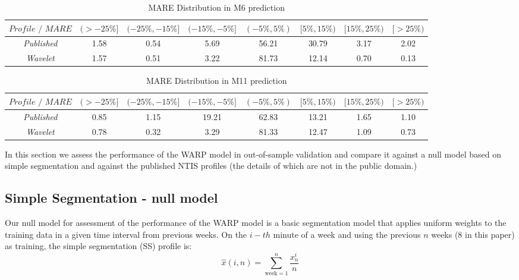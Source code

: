 \documentclass[a4paper, 10pt, conference]{ieeeconf}      %
\begin{document}
\begin{table}[bp]
	\caption{MARE Distribution in M6 prediction}
	\centering
	\begin{center}
	\begin{tabular}{SSSSSSSS} \toprule
    {$\textit{Profile / MARE}$} & {$(>-25\%]$} & {$(-25\%,-15\%] $} & {$(-15\%,-5\%]$} & {$(-5\%,5\%)$} & {$[5\%,15\%)$} & {$[15\%,25\%)$} & {$[>25\%)$} \\ \midrule
    \textit{Published}  & 1.58 & 0.54 & 5.69 & 56.21 & 30.79 & 3.17 & 2.02 \\
    \textit{Wavelet}  & 1.57  & 0.51 & 3.22  & 81.73 & 12.14 & 0.70  & 0.13 \\ \bottomrule
\end{tabular}
	\end{center}
\end{table}
\begin{table}[bp]
	\caption{MARE Distribution in M11 prediction}
	\centering
	\begin{center}
	\begin{tabular}{SSSSSSSS} \toprule
    {$\textit{Profile / MARE}$} & {$(>-25\%]$} & {$(-25\%,-15\%] $} & {$(-15\%,-5\%]$} & {$(-5\%,5\%)$} & {$[5\%,15\%)$} & {$[15\%,25\%)$} & {$[>25\%)$} \\ \midrule
    \textit{Published}  & 0.85 & 1.15 & 19.21 & 62.83 & 13.21 & 1.65 & 1.10 \\
    \textit{Wavelet}  & 0.78  & 0.32 & 3.29  & 81.33 & 12.47 & 1.09  & 0.73 \\ \bottomrule
\end{tabular}
	\end{center}
\end{table}


In this section we assess the performance of the WARP model in out-of-sample validation and compare it against a null model based on simple segmentation and against the published NTIS profiles (the details of which are not in the public domain.)

\subsection{Simple Segmentation - null model}
Our null model for assessment of the performance of the WARP model is a basic segmentation model that applies uniform weights to the training data in a given time interval from previous weeks. 
On the $i-th$ minute of a week and using the previous $n$ weeks (8 in this paper) as training, the simple segmentation (SS) profile is:
\begin{equation}
\hat{x}(i,n) = \sum_{\textrm{week}=1}^{n} \frac{x^i_n}{n} 
\end{equation}
\end{document}
